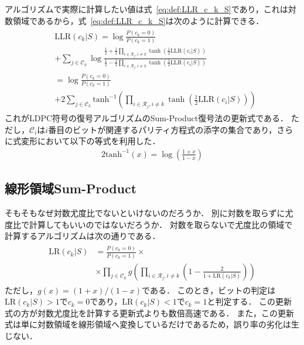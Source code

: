 \documentclass[twocolumn, a4paper]{ieicejsp}
\newcommand{\brkts}[1]{\left(#1\right)}
\newcommand{\arctanh}{\mathrm{tanh}^{-1}}
\begin{document}
アルゴリズムで実際に計算したい値は式~\eqref{eq:def:LLR_c_k_S}であり，これは対数領域であるから，式~\eqref{eq:def:LLR_c_k_S}は次のように計算できる．
\begin{align}
  \begin{split}
    &\mathrm{LLR}(c_k|S) = \log \frac{P(c_k=0)}{P(c_k=1)} \\
    &+ \sum_{j \in \mathcal{C}_k} \log \frac{  \frac{1}{2} + \frac{1}{2} \prod_{i \in \mathcal{R}_j, i \not= k} \tanh\brkts{\frac{1}{2} \mathrm{LLR}(c_i|S) } }{  \frac{1}{2} - \frac{1}{2} \prod_{i \in \mathcal{R}_j, i \not= k} \tanh\brkts{\frac{1}{2} \mathrm{LLR}(c_i|S) } } \\
    &= \log \frac{P(c_k=0)}{P(c_k=1)} \\
    &+ 2 \sum_{j\in \mathcal{C}_k } \arctanh\brkts{ \prod_{i \in \mathcal{R}_j, i \not= k} \tanh\brkts{\frac{1}{2} \mathrm{LLR}(c_i|S) } }
  \end{split}
\end{align}
これがLDPC符号の復号アルゴリズムのSum-Product復号法の更新式である．
ただし，$\mathcal{C}_i$は$i$番目のビットが関連するパリティ方程式の添字の集合であり，さらに式変形において以下の等式を利用した．
\begin{align}
  2 \arctanh(x) = \log \brkts{\frac{1+x}{1-x}}
\end{align}


\subsection{線形領域Sum-Product}

そもそもなぜ対数尤度比でないといけないのだろうか．
別に対数を取らずに尤度比で計算してもいいのではないだろうか．
対数を取らないで尤度比の領域で計算するアルゴリズムは次の通りである．
\begin{align}
  \begin{split}
    \mathrm{LR}(c_k|S) &= \frac{P(c_k=0)}{P(c_k=1)} \times \\
    &\times \prod_{j \in \mathcal{C}_k} g\brkts{\prod_{i \in \mathcal{R}_j,i\not=k} \brkts{ 1 - \frac{2}{1+ \mathrm{LR}(c_k|S) } } }
  \end{split}
\end{align}
ただし，$g(x)=(1+x)/(1-x)$である．
このとき，ビットの判定は$\mathrm{LR}(c_k|S) > 1$で$c_k=0$であり，$\mathrm{LR}(c_k|S) < 1$で$c_k=1$と判定する．
この更新式の方が対数尤度比を計算する更新式よりも数倍高速である．
また，この更新式は単に対数領域を線形領域へ変換しているだけであるため，誤り率の劣化は生じない．
\end{document}

